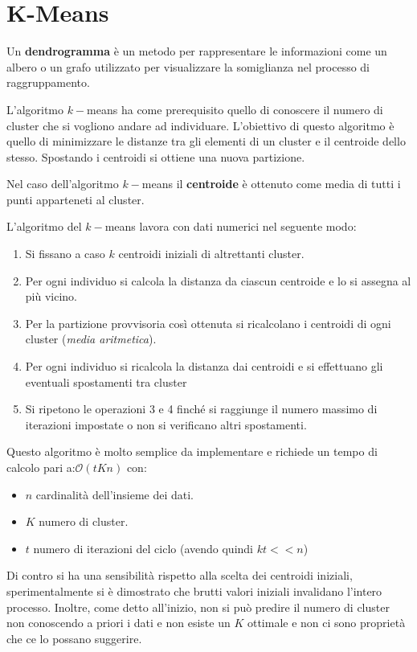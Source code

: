 \section{K-Means}
\begin{definizione}
    Un \textbf{dendrogramma} è un metodo per rappresentare le informazioni come
    un albero o un grafo utilizzato per visualizzare la somiglianza nel processo
    di raggruppamento.
\end{definizione}
L'algoritmo $k-$means ha come prerequisito quello di conoscere il numero di cluster
che si vogliono andare ad individuare. L'obiettivo di questo algoritmo è quello
di minimizzare le distanze tra gli elementi di un cluster e il centroide dello stesso.
Spostando i centroidi si ottiene una nuova partizione.
\begin{definizione}
    Nel caso dell'algoritmo $k-$means il \textbf{centroide} è ottenuto come media
    di tutti i punti apparteneti al cluster.
\end{definizione}
L'algoritmo del $k-$means lavora con dati numerici nel seguente modo:
\begin{enumerate}
    \item Si fissano a caso $k$ centroidi iniziali di altrettanti cluster.
    \item Per ogni individuo si calcola la distanza da ciascun centroide e lo si
          assegna al più vicino.
    \item Per la partizione provvisoria così ottenuta si ricalcolano i centroidi
          di ogni cluster (\textit{media aritmetica}).
    \item Per ogni individuo si ricalcola la distanza dai centroidi e si effettuano
          gli eventuali spostamenti tra cluster
    \item Si ripetono le operazioni 3 e 4 finché si raggiunge il numero massimo
          di iterazioni impostate o non si verificano altri spostamenti.
\end{enumerate}
Questo algoritmo è molto semplice da implementare e richiede un tempo di calcolo
pari a:$\mathcal{O}(tKn)$ con:
\begin{itemize}
    \item $n$ cardinalità dell'insieme dei dati.
    \item $K$ numero di cluster.
    \item $t$ numero di iterazioni del ciclo (avendo quindi $kt << n$)
\end{itemize}
Di contro si ha una sensibilità rispetto alla scelta dei centroidi iniziali,
sperimentalmente si è dimostrato che brutti valori iniziali invalidano l'intero
processo. Inoltre, come detto all'inizio, non si può predire il numero di cluster
non conoscendo a priori i dati e non esiste un $K$ ottimale e non ci sono proprietà
che ce lo possano suggerire.

